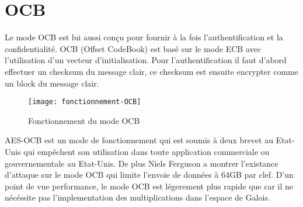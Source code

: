\newpage


\section{OCB}
Le mode OCB est lui aussi conçu pour fournir à la fois l'authentification et la confidentialité. OCB (Offset CodeBook) est basé sur le mode ECB avec l'utilisation d'un vecteur d'initialisation. Pour l'authentification il faut d'abord effectuer un checksum du message clair, ce checksum est ensuite encrypter comme un block du message clair. 

\begin{figure}[!h]
  \centering
  \texttt{[image: fonctionnement-OCB]}
  \caption{Fonctionnement du mode OCB}
  \label{Fonctionnement du mode OCB}
\end{figure}

AES-OCB est un mode de fonctionnement qui est soumis à deux brevet au Etat-Unis qui empêchent son utilisation dans toute application commerciale ou gouvernementale au Etat-Unis. 
De plus Niels Ferguson a montrer l'existance d'attaque sur le mode OCB qui limite l'envoie de données à 64GB par clef. D'un point de vue performance, le mode OCB est légerement plus rapide que \aes car il ne nécéssite pas l'implementation des multiplications dans l'espace de Galois.


